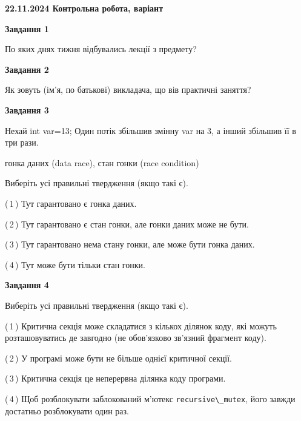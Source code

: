 \documentclass[12pt, ukrainian]{article}
\def\code#1{\Verb!#1!}
\begin{document}
\begin {large}

\textbf{22.11.2024 Контрольна робота, варіант  }\par


{

\begin{center}
\textbf{Завдання 1}
\end{center}

По яких днях тижня відбувались лекції з предмету?


\begin{center}
\textbf{Завдання 2}
\end{center}

Як зовуть (ім'я, по батькові) викладача, що вів практичні заняття?


\begin{center}
\textbf{Завдання 3}
\end{center}

Нехай int var=13; Один потік збільшив змінну var на 3, а інший збільшив її в три рази.

гонка даних (data race), стан гонки (race condition)

Виберіть усі правильні твердження (якщо такі є).\par
\vspace{2mm}
(\,1\,) Тут гарантовано є гонка даних.%

(\,2\,) Тут гарантовано є стан гонки, але гонки даних може не бути.%

(\,3\,) Тут гарантовано нема стану гонки, але може бути гонка даних.%

(\,4\,) Тут може бути тільки стан гонки.%


\begin{center}
\textbf{Завдання 4}
\end{center}

Виберіть усі правильні твердження (якщо такі є).\par
\vspace{2mm}

(\,1\,) Критична секція може складатися з кількох ділянок коду, які можуть розташовуватись де завгодно (не обов’язково зв’язний фрагмент коду).%

(\,2\,) У програмі може бути не більше однієї критичної секції.%

(\,3\,) Критична секція це неперервна ділянка коду програми.%

(\,4\,) Щоб розблокувати заблокований м’ютекс \code{recursive\_mutex}, його завжди достатньо розблокувати один раз.%


}
\end{large}
\end{document}
